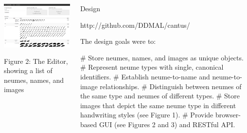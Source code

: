 \documentclass[final]{beamer}
\newlength{\onecolwid}
\newcommand{\blockSpace}{\vskip 0.75ex}
\begin{document}
\begin{frame}[fragile,t]
\begin{columns}
\begin{column}{\onecolwid}
\begin{block}{}

\vspace{-3cm}

\centering
\includegraphics[width=\onecolwid]{images/neume-list-interface_cropped.png} 

Figure 2: The Editor, showing a list of neumes, names, and images
\end{block}
\end{column}

\begin{column}{\onecolwid}
\vspace{3cm}
\begin{block}{Design}
\begin{center}
\vspace{-0.25\baselineskip}
\small{http://github.com/DDMAL/cantus/}
\normalsize
\vspace{0.25\baselineskip}
\end{center}

\raggedright

The design goals were to:

\begin{easylist}[itemize]
# Store neumes, names, and images as unique objects.
# Represent neume types with single, canonical identifiers.
# Establish neume-to-name and neume-to-image relationships.
# Distinguish between neumes of the same type and neumes of different types.
# Store images that depict the same neume type in different handwriting styles (see Figure 1).
# Provide browser-based GUI (see Figures 2 and 3) and RESTful API.
\end{easylist}


\end{block}
\end{column}
\end{columns}
\end{frame}
\end{document}
